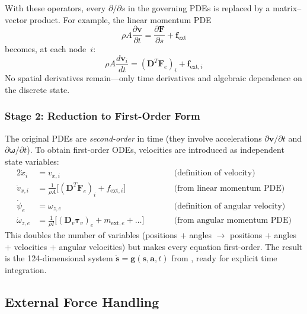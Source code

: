 \documentclass[11pt]{article}
\begin{document}
With these operators, every $\partial/\partial s$ in the governing PDEs is replaced by a matrix--vector product.
For example, the linear momentum PDE
\begin{equation}
  \rho A \frac{\partial \mathbf{v}}{\partial t}
  = \frac{\partial \mathbf{F}}{\partial s} + \mathbf{f}_{\text{ext}}
\end{equation}
becomes, at each node~$i$:
\begin{equation}
  \rho A \frac{d \mathbf{v}_i}{d t}
  = (\mathbf{D}^T \mathbf{F}_e)_i + \mathbf{f}_{\text{ext},i}
  \label{eq:node-ode}
\end{equation}
No spatial derivatives remain---only time derivatives and algebraic dependence on the discrete state.

\subsubsection{Stage 2: Reduction to First-Order Form}

The original PDEs are \emph{second-order} in time (they involve accelerations $\partial \mathbf{v}/\partial t$ and $\partial \boldsymbol{\omega}/\partial t$).
To obtain first-order ODEs, velocities are introduced as independent state variables:
\begin{alignat}{2}
  \dot{x}_i &= v_{x,i}       &\qquad& \text{(definition of velocity)} \label{eq:first-order-pos}\\
  \dot{v}_{x,i} &= \frac{1}{\rho A}\bigl[(\mathbf{D}^T \mathbf{F}_e)_i + f_{\text{ext},i}\bigr]
    &\qquad& \text{(from linear momentum PDE)} \label{eq:first-order-vel}\\[4pt]
  \dot{\psi}_e &= \omega_{z,e} &\qquad& \text{(definition of angular velocity)} \label{eq:first-order-angle}\\
  \dot{\omega}_{z,e} &= \frac{1}{\rho I}\bigl[(\mathbf{D}_v \boldsymbol{\tau}_v)_e + m_{\text{ext},e} + \ldots\bigr]
    &\qquad& \text{(from angular momentum PDE)} \label{eq:first-order-omega}
\end{alignat}
This doubles the number of variables (positions $+$ angles $\to$ positions $+$ angles $+$ velocities $+$ angular velocities) but makes every equation first-order.
The result is the 124-dimensional system $\dot{\mathbf{s}} = \mathbf{g}(\mathbf{s}, \mathbf{a}, t)$ from , ready for explicit time integration.

\subsection{External Force Handling}
\label{app:physics:forces}
\end{document}

